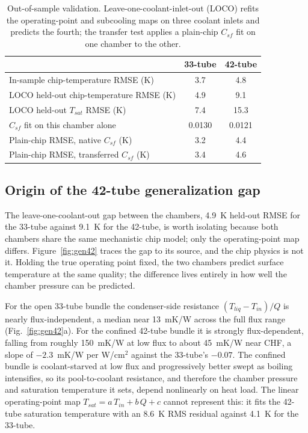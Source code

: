 \documentclass[11pt]{article}
\begin{document}
\begin{table}[H]
\centering
\caption{Out-of-sample validation. Leave-one-coolant-inlet-out (LOCO) refits the operating-point and
subcooling maps on three coolant inlets and predicts the fourth; the transfer test applies a
plain-chip $C_{sf}$ fit on one chamber to the other.}
\label{tab:crossval}
\begin{tabular}{lcc}
\toprule
 & 33-tube & 42-tube\\
\midrule
In-sample chip-temperature RMSE (K) & 3.7 & 4.8\\
LOCO held-out chip-temperature RMSE (K) & 4.9 & 9.1\\
LOCO held-out $T_{sat}$ RMSE (K) & 7.4 & 15.3\\
\midrule
$C_{sf}$ fit on this chamber alone & 0.0130 & 0.0121\\
Plain-chip RMSE, native $C_{sf}$ (K) & 3.2 & 4.4\\
Plain-chip RMSE, transferred $C_{sf}$ (K) & 3.4 & 4.6\\
\bottomrule
\end{tabular}
\end{table}

\subsection{Origin of the 42-tube generalization gap}
\label{sec:gen42}
The leave-one-coolant-out gap between the chambers, 4.9~K held-out RMSE for the 33-tube against
9.1~K for the 42-tube, is worth isolating because both chambers share the same mechanistic chip
model; only the operating-point map differs. Figure~\ref{fig:gen42} traces the gap to its source,
and the chip physics is not it. Holding the true operating point fixed, the two chambers predict
surface temperature at the same quality; the difference lives entirely in how well the chamber
pressure can be predicted.

For the open 33-tube bundle the condenser-side resistance $(T_{liq}-T_{in})/Q$ is nearly
flux-independent, a median near 13~mK/W across the full flux range (Fig.~\ref{fig:gen42}a). For the
confined 42-tube bundle it is strongly flux-dependent, falling from roughly 150~mK/W at low flux to
about 45~mK/W near CHF, a slope of $-2.3$~mK/W per W/cm$^2$ against the 33-tube's $-0.07$. The
confined bundle is coolant-starved at low flux and progressively better swept as boiling intensifies,
so its pool-to-coolant resistance, and therefore the chamber pressure and saturation temperature it
sets, depend nonlinearly on heat load. The linear operating-point map $T_{sat}=a\,T_{in}+b\,Q+c$
cannot represent this: it fits the 42-tube saturation temperature with an 8.6~K RMS residual against
4.1~K for the 33-tube.
\end{document}
